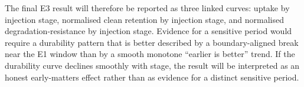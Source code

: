 The final E3 result will therefore be reported as three linked curves: uptake by injection stage, normalised clean retention by injection stage, and normalised degradation-resistance by injection stage. Evidence for a sensitive period would require a durability pattern that is better described by a boundary-aligned break near the E1 window than by a smooth monotone ``earlier is better'' trend. If the durability curve declines smoothly with stage, the result will be interpreted as an honest early-matters effect rather than as evidence for a distinct sensitive period.
